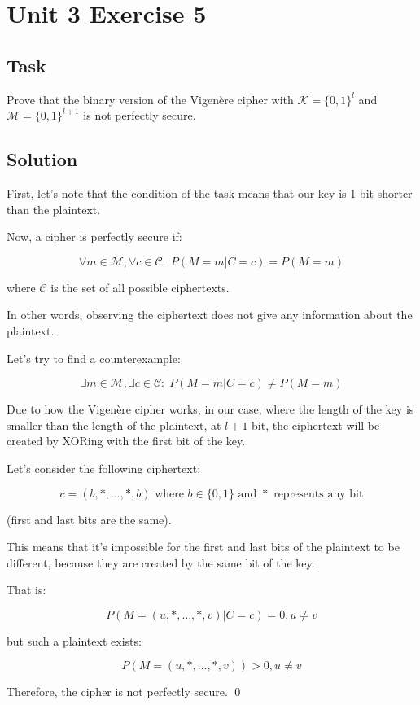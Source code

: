 \section{Unit 3 Exercise 5}

\subsection{Task}
Prove that the binary version of the Vigenère cipher with $\mathcal{K} = \{0, 1\}^l$ and $\mathcal{M} = \{0, 1\}^{l+1}$ is not perfectly secure.

\subsection{Solution}

First, let's note that the condition of the task means that our key is 1 bit shorter than the plaintext.

Now, a cipher is perfectly secure if:

\begin{equation}
\forall m \in \mathcal{M}, \forall c \in \mathcal{C}: \; P(M = m | C = c) = P(M = m)
\end{equation}

where $\mathcal{C}$ is the set of all possible ciphertexts.

In other words, observing the ciphertext does not give any information about the plaintext.

Let's try to find a counterexample:

\begin{equation}
\exists m \in \mathcal{M}, \exists c \in \mathcal{C}: \; P(M = m | C = c) \neq P(M = m)
\end{equation}

Due to how the Vigenère cipher works, in our case, where the length of the key is smaller than the length of the plaintext, at $l+1$ bit, the ciphertext will be created by XORing with the first bit of the key.

Let's consider the following ciphertext:

\begin{equation}
c = (b, *, \ldots, *, b) \text{ where } b \in \{0,1\} \text{ and } * \text{ represents any bit}
\end{equation}

(first and last bits are the same).

This means that it's impossible for the first and last bits of the plaintext to be different, because they are created by the same bit of the key.

That is:

\begin{equation}
P(M = (u, *, \ldots, *, v) | C = c) = 0, u \neq v
\end{equation}

but such a plaintext exists:

\begin{equation}
P(M = (u, *, \ldots, *, v)) > 0, u \neq v
\end{equation}

Therefore, the cipher is not perfectly secure. \qed

